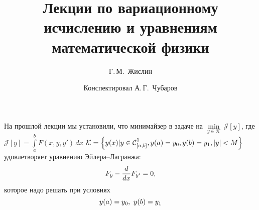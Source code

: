 \documentclass[12pt,a4paper,openany,fleqn]{book}
\newcommand{\Cf}{\ensuremath{\mathcal{C}}}
\newcommand{\J}{\ensuremath{\mathcal{J}}}
\newcommand{\mc}[1]{\ensuremath{\mathcal{#1}}}
\newcommand{\Cfn}[2][]{\ensuremath{\Cf{\mathstrut}^{#2}_{#1}}}
\newcommand{\der}[2]{\ensuremath{\frac{d#1}{d#2}}}
\newcommand{\K}{\mc{K}}
\theoremstyle{definition}
\begin{document}
	\author{Г.\,М.~Жислин}
	\title{Лекции по вариационному исчислению и уравнениям математической физики}
	\date{Конспектировал А.\,Г.~Чубаров}
	
	
	
	\maketitle
	
	
	\renewcommand{\thepart}{\Asbuk{part}}
	\renewcommand{\thechapter}{\arabic{chapter}}
	\renewcommand{\thesection}{\arabic{section}}
	\renewcommand{\thesubsection}{\Roman{subsection}}
	\renewcommand{\thefootnote}{\roman{footnote}}
	\renewcommand{\phi}{\varphi}
	
\setcounter{chapter}{1}
	\chapter{}
	\label{lecture2}
	
	\noindent На прошлой лекции мы установили, что минимайзер в задаче на $\min\limits_{y\in\K}\,\J[y]$, где  $\J[y]=\int\limits_a^b F(x,y,y')\,dx$ $\K=\left\{y(x)|y\in\Cfn[{[a,b]}]{1}, y(a)=y_0, y(b)=y_1, |y|<M\right\}$ удовлетворяет уравнению Эйлера--Лагранжа:
	\begin{equation}
		\label{l2:eq:1}
		\hfill F_y-\der{}{x}F_{y'}=0,\hfill
	\end{equation} 
	которое надо решать при условиях 
	\begin{equation}
		\label{l2:eq:2}
		\hfill y(a)=y_0,\ y(b)=y_1\hfill
	\end{equation}
\end{document}
